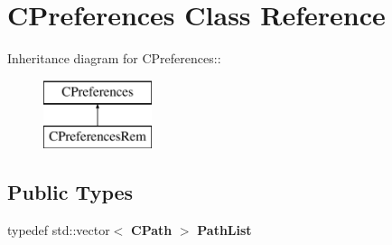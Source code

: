 \section{CPreferences Class Reference}
\label{classCPreferences}
Inheritance diagram for CPreferences::\begin{figure}[H]
\begin{center}
\leavevmode
\includegraphics[height=2cm]{classCPreferences}
\end{center}
\end{figure}
\subsection*{Public Types}
\begin{DoxyCompactItemize}
\item 
typedef std::vector$<$ {\bf CPath} $>$ {\bfseries PathList}\label{classCPreferences_aa9984e7d9fc122040369546290abb9c8}

\end{DoxyCompactItemize}
